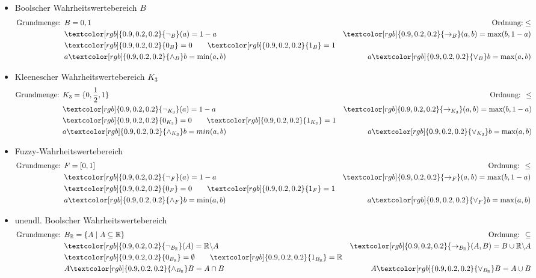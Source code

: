 \documentclass[12pt,a4paper]{report}
\newcommand{\ra}{\rightarrow}
\newcommand{\real}{\mathbb{R}}
\newcommand{\red}[1]{\textcolor[rgb]{0.9,0.2,0.2}{#1}}
\begin{document}
\begin{itemize}
    \item \red{Boolscher Wahrheitswertebereich $ B $}
    \begin{align*}
        \textnormal{Grundmenge: } & B = {0,1}
        &\textnormal{Ordnung:}  \leq\\
        & \red{\lnot_B}(a) = 1 - a & \red{\ra_B}(a,b) = \max(b, 1-a)\\
        & \red{0_B} = 0 \qquad \red{1_B} = 1\\
        & a \red{\wedge_B} b = \min(a,b) & a \red{\vee_B} b = \max(a,b)
    \end{align*}
    \item \red{Kleenescher Wahrheitswertebereich $ K_3 $}
    \begin{align*}
        \textnormal{Grundmenge: } & K_3 = \{0, \frac{ 1 }{ 2 } , 1\} & \textnormal{Ordnung: } \leq\\
        & \red{\lnot_{K_3}}(a) = 1 - a & \red{\ra_{K_3}}(a,b) = \max(b,1-a)\\
        & \red{0_{K_3}} = 0 \qquad \red{1_{K_3}} = 1\\
        & a \red{\wedge_{K_3}} b = min(a,b) & a \red{\vee_{K_3}} b = \max(a,b)
    \end{align*}
    \item \red{Fuzzy-Wahrheitswertebereich}
    \begin{align*}
        \textnormal{Grundmenge: } & F = [0,1] & \textnormal{Ordnung: } \leq\\
        &\red{\lnot_F}(a) = 1-a & \red{\ra_F} (a,b) = \max(b,1-a)\\
        &\red{0_F} = 0 \qquad \red{1_F} = 1\\
        &a \red{\wedge_F} b = \min(a,b) & a \red{\vee_F} b = \max(a,b)
    \end{align*}
    \item \red{unendl. Boolscher Wahrheitswertebereich}
    \begin{align*}
        \textnormal{Grundmenge: } & B_\real = \{A \mid A \subseteq \real\} & \textnormal{Ordnung: } \subseteq\\
        &\red{\lnot_{B_\real}}(A) = \real \backslash A & \red{\ra_{B_\real}} (A,B) = B \cup \real \backslash A\\
        &\red{0_{B_\real}} = \emptyset \qquad \red{1_{B_\real}} = \real\\
        &A \red{\wedge_{B_\real}} B = A \cap B & A \red{\vee_{B_\real}} B = A \cup B
    \end{align*}

\end{itemize}
\end{document}
